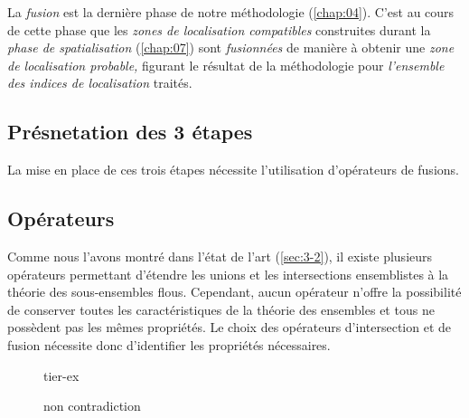 La \emph{fusion} est la dernière phase de notre méthodologie
(\autoref{chap:04}). C'est au cours de cette phase que les \emph{zones
  de localisation compatibles} construites durant la \emph{phase de
  spatialisation} (\autoref{chap:07}) sont \emph{fusionnées} de
manière à obtenir une \emph{zone de localisation probable,} figurant
le résultat de la méthodologie pour \emph{l'ensemble des indices de
  localisation} traités.

\subsection{Présnetation des 3 étapes}



La mise en place de ces trois étapes nécessite l'utilisation
d'opérateurs de fusions.


\subsection{Opérateurs}

Comme nous l'avons montré dans l'état de l'art (\autoref{sec:3-2}), il
existe plusieurs opérateurs permettant d'étendre les unions et les
intersections ensemblistes à la théorie des sous-ensembles
flous. Cependant, aucun opérateur n'offre la possibilité de conserver
toutes les caractéristiques de la théorie des ensembles et tous
ne possèdent pas les mêmes propriétés. Le choix des opérateurs
d'intersection et de fusion nécessite donc d'identifier les
propriétés nécessaires.






\begin{figure}
  \centering
  
  \caption{tier-ex}
\end{figure}


\begin{figure}
  \centering
  
  \caption{non contradiction}
\end{figure}


